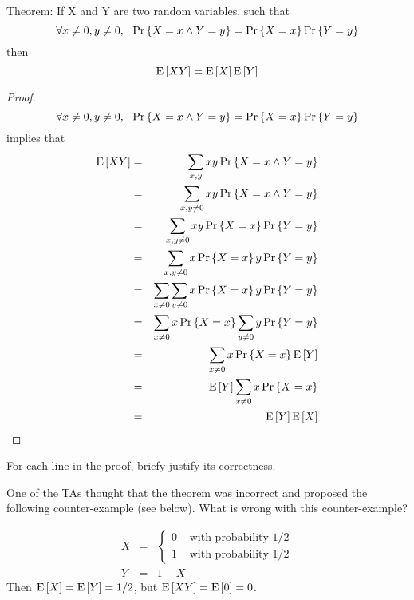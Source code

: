 \documentclass[11pt,twoside]{article}
\begin{document}
\iffalse
\begin{problem}

Theorem: If X and Y are two random variables, such that
$$
\forall x\neq 0, y\neq 0,~~\prob{X=x\wedge Y=y}=\prob{X=x}\prob{Y=y}
$$
then
$$
\expect{XY}=\expect{X}\expect{Y}
$$

\begin{proof}
$$
\forall x\neq 0, y\neq 0,~~\prob{X=x\wedge Y=y}=\prob{X=x}\prob{Y=y}
$$
implies that
\begin{eqnarray}
\expect{XY}&=&\sum_{x, y} xy\prob{X=x \wedge Y=y}\\
&=&\sum_{x, y\neq 0} xy\prob{X=x \wedge Y=y}\\
&=&\sum_{x, y\neq 0} xy\prob{X=x}\prob{Y=y}\\
&=&\sum_{x, y\neq 0} x\prob{X=x}y\prob{Y=y}\label{frombug}\\
&=&\sum_{x\neq 0}\sum_{y\neq 0}x\prob{X=x}y\prob{Y=y}\\
&=&\sum_{x\neq 0} x\prob{X=x} \sum_{y\neq 0} y\prob{Y=y}\label{tobug} \\
&=&\sum_{x\neq 0} x\prob{X=x} \expect{Y} \\
&=&\expect{Y}\sum_{x\neq 0} x\prob{X=x}  \\
&=&\expect{Y}\expect{X}
\end{eqnarray}
\end{proof}

\begin{problemparts}
\problempart For each line in the proof, briefy justify its correctness. 


\problempart 
One of the TAs thought that the theorem was incorrect and proposed the following
counter-example (see below). What is wrong with this counter-example?

\begin{eqnarray*}
X&=&\left\{
\begin{array}{ll}
0&\textrm{  with probability }1/2\\
1&\textrm{  with probability }1/2
\end{array}\right.\\
Y&=&1-X
\end{eqnarray*}
Then $\expect{X}=\expect{Y}=1/2$, but $\expect{XY}=\expect{0}=0$.

\end{problemparts} 
\end{problem}
\end{document}
